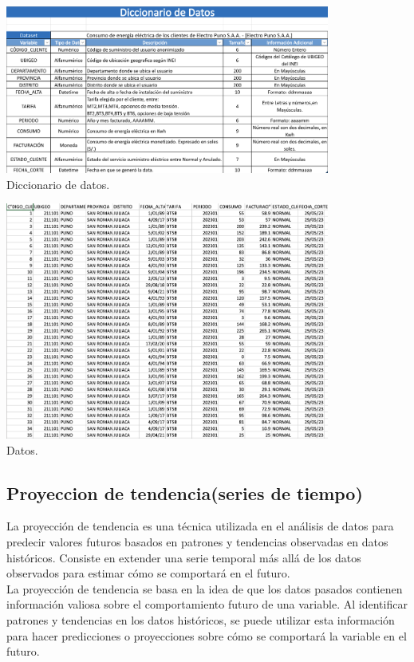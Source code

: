 \documentclass{article}
\begin{document}
\begin{minipage}{\textwidth}
  \centering
  \includegraphics[width=0.8\textwidth]{./img/Captura de pantalla 2023-07-05 a la(s) 19.02.26.png}
  \\
  {Diccionario de datos.}
  \label{fig:etiqueta}
\end{minipage}
\begin{minipage}{\textwidth}
  \centering
  \includegraphics[width=0.8\textwidth]{./img/Captura de pantalla 2023-07-05 a la(s) 19.11.39.png}
  \\
  {Datos.}
  \label{fig:etiqueta}
\end{minipage}
\subsection{Proyeccion de tendencia(series de tiempo)}
La proyección de tendencia es una técnica utilizada en el análisis de datos para predecir valores futuros basados en patrones y tendencias observadas en datos históricos. Consiste en extender una serie temporal más allá de los datos observados para estimar cómo se comportará en el futuro.
\\

La proyección de tendencia se basa en la idea de que los datos pasados contienen información valiosa sobre el comportamiento futuro de una variable. Al identificar patrones y tendencias en los datos históricos, se puede utilizar esta información para hacer predicciones o proyecciones sobre cómo se comportará la variable en el futuro.
\end{document}
